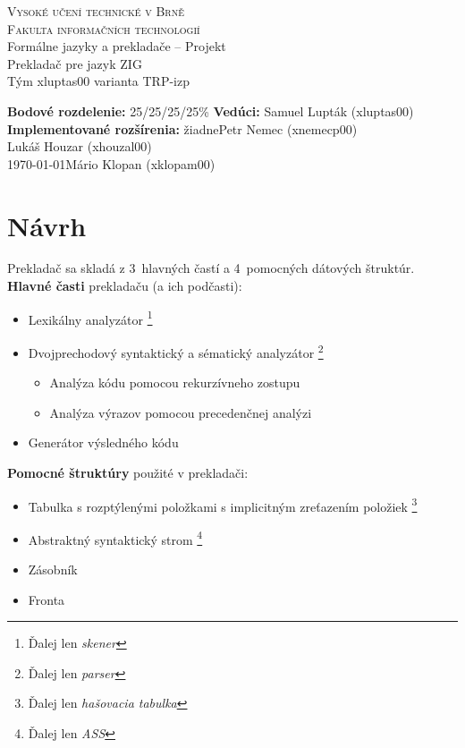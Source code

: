 \documentclass[Slovak, a4paper, 12pt]{article}
\begin{document}
	\begin{titlepage}
		
		\begin{center}
			\textsc{{\LARGE Vysoké učení technické v Brně \\[0.5em]}  {\LARGE Fakulta informačních technologií}} \\
			{\Large Formálne jazyky a prekladače  -- Projekt \\[0.6em]}
			{\huge Prekladač pre jazyk ZIG} \\[0.6em]
			{\large Tým xluptas00 varianta TRP-izp}
			
		\end{center}
		\begin{flushright}
			{ \textbf{Bodové rozdelenie:} 25/25/25/25\% \hfill \textbf{Vedúci: }Samuel Lupták (xluptas00)} \\
			{ \textbf{Implementované rozšírenia:} žiadne\hfill  Petr Nemec (xnemecp00)} \\
			{ \hfill  Lukáš Houzar (xhouzal00)} \\
			{\today \hfill Mário Klopan (xklopam00)}
		\end{flushright}
		
	\end{titlepage}
	
	\section{Návrh}
	\noindent Prekladač sa skladá z 3~hlavných častí a 4~pomocných dátových štruktúr.\\
	\textbf{Hlavné časti} prekladaču (a ich podčasti):
	\begin{itemize}
		\item Lexikálny analyzátor \footnote[1]{Ďalej len \textit{skener}}
		\item Dvojprechodový syntaktický a sématický analyzátor \footnote[2]{Ďalej len \textit{parser}}
		\begin{itemize} 
			\item Analýza kódu pomocou rekurzívneho zostupu
			\item Analýza výrazov pomocou precedenčnej analýzi 
		\end{itemize}
		\item Generátor výsledného kódu
	\end{itemize}
	
	\noindent\textbf{Pomocné štruktúry} použité v prekladači:
		\begin{itemize}
		\item  Tabulka s rozptýlenými položkami s implicitným zreťazením položiek \footnote[3]{Ďalej len \textit{hašovacia tabulka}}
		\item Abstraktný syntaktický strom \footnote[4]{Ďalej len \textit{ASS}}
		\item Zásobník
		\item Fronta
	\end{itemize}
	
\end{document}
